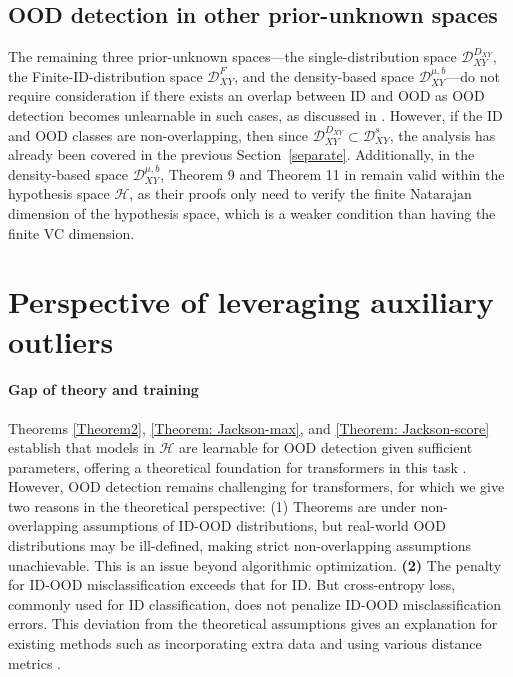 \documentclass{article}
\theoremstyle{plain}
\theoremstyle{definition}
\theoremstyle{remark}
\begin{document}
\subsection{OOD detection in other prior-unknown spaces}
The remaining three prior-unknown spaces---the single-distribution space $\mathcal{D}_{XY}^{D_{XY}}$, the Finite-ID-distribution space $\mathcal{D}_{XY}^F$, and the density-based space $\mathcal{D}_{XY}^{\mu,b}$---do not require consideration if there exists an overlap between ID and OOD as OOD detection becomes unlearnable in such cases, as discussed in \citet{fang2022out}. However, if the ID and OOD classes are non-overlapping, then since $\mathcal{D}_{XY}^{D_{XY}}\subset \mathcal{D}_{XY}^s$, the analysis has already been covered in the previous Section~\ref{separate}.
%
Additionally, in the density-based space $\mathcal{D}_{XY}^{\mu,b}$, Theorem 9 and Theorem 11 in \citet{fang2022out} remain valid within the hypothesis space $\mathcal{H}$, as their proofs only need to verify the finite Natarajan dimension \citep{shalev2014understanding} of the hypothesis space, which is a weaker condition than having the finite VC dimension.
\section{Perspective of leveraging auxiliary outliers}
\label{perspective}
\paragraph{Gap of theory and training}
%
Theorems \ref{Theorem2}, \ref{Theorem: Jackson-max}, and \ref{Theorem: Jackson-score} establish that models in $\mathcal{H}$ are learnable for OOD detection given sufficient parameters, offering a theoretical foundation for transformers in this task \citep{koner2021oodformer, fort2021exploring}. 
%
However, OOD detection remains challenging for transformers, for which we give two reasons in the theoretical perspective: (1) 
Theorems are under non-overlapping assumptions of ID-OOD distributions, but real-world OOD distributions may be ill-defined, making strict non-overlapping assumptions unachievable. This is an issue beyond algorithmic optimization. \textbf{(2)} The penalty for ID-OOD misclassification exceeds that for ID. But cross-entropy loss, commonly used for ID classification, does not penalize ID-OOD misclassification errors. 
%
This deviation from the theoretical assumptions gives an explanation for existing methods such as incorporating extra data \citep{fort2021exploring, tao2023non} and using various distance metrics \citep{podolskiy2021revisiting}. 
\end{document}
